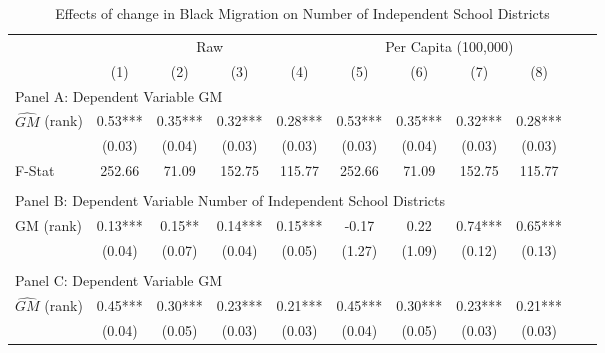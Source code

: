  \begin{table}[htbp]\centering {} \begin{threeparttable} \caption{Effects of change in Black Migration on Number of Independent School Districts} \begin{tabular}{l*{10}{c}} \toprule
                &\multicolumn{4}{c}{Raw}                                    &\multicolumn{4}{c}{Per Capita (100,000)}                   \\\cmidrule(lr){2-5}\cmidrule(lr){6-9}
                &\multicolumn{1}{c}{(1)}   &\multicolumn{1}{c}{(2)}   &\multicolumn{1}{c}{(3)}   &\multicolumn{1}{c}{(4)}   &\multicolumn{1}{c}{(5)}   &\multicolumn{1}{c}{(6)}   &\multicolumn{1}{c}{(7)}   &\multicolumn{1}{c}{(8)}   \\
\cmidrule(lr){1-9}
\multicolumn{8}{l}{Panel A: Dependent Variable GM}\\
\cmidrule(lr){1-9}
$\hat{GM}$ (rank)&       0.53***&       0.35***&       0.32***&       0.28***&       0.53***&       0.35***&       0.32***&       0.28***\\
                &     (0.03)   &     (0.04)   &     (0.03)   &     (0.03)   &     (0.03)   &     (0.04)   &     (0.03)   &     (0.03)   \\
\midrule
F-Stat          &     252.66   &      71.09   &     152.75   &     115.77   &     252.66   &      71.09   &     152.75   &     115.77   \\
\cmidrule[\heavyrulewidth](lr){1-9} \\ \cmidrule[\heavyrulewidth](lr){1-9}
\multicolumn{8}{l}{Panel B: Dependent Variable Number of Independent School Districts}\\
\cmidrule(lr){1-9}
GM  (rank)      &       0.13***&       0.15** &       0.14***&       0.15***&      -0.17   &       0.22   &       0.74***&       0.65***\\
                &     (0.04)   &     (0.07)   &     (0.04)   &     (0.05)   &     (1.27)   &     (1.09)   &     (0.12)   &     (0.13)   \\
\cmidrule[\heavyrulewidth](lr){1-9} \\ \cmidrule[\heavyrulewidth](lr){1-9}
\multicolumn{8}{l}{Panel C: Dependent Variable GM}\\
\cmidrule(lr){1-9}
$\hat{GM}$ (rank)&       0.45***&       0.30***&       0.23***&       0.21***&       0.45***&       0.30***&       0.23***&       0.21***\\
                &     (0.04)   &     (0.05)   &     (0.03)   &     (0.03)   &     (0.04)   &     (0.05)   &     (0.03)   &     (0.03)   \\

\end{tabular}
\end{threeparttable}
\end{table}

